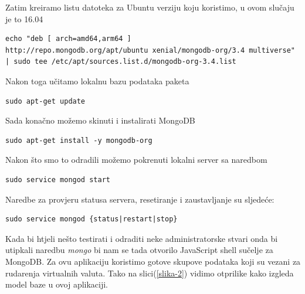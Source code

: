 \documentclass[a4paper,12pt]{foi}
\begin{document}
Zatim kreiramo listu datoteka za Ubuntu verziju koju koristimo, u ovom slučaju je to 16.04


\lstset{commentstyle=\textit,language=python}
\begin{lstlisting}[frame=tb]
echo "deb [ arch=amd64,arm64 ] 
http://repo.mongodb.org/apt/ubuntu xenial/mongodb-org/3.4 multiverse" 
| sudo tee /etc/apt/sources.list.d/mongodb-org-3.4.list
\end{lstlisting}


Nakon toga učitamo lokalnu bazu podataka paketa


\lstset{commentstyle=\textit,language=python}
\begin{lstlisting}[frame=tb]
sudo apt-get update
\end{lstlisting}


Sada konačno možemo skinuti i instalirati MongoDB


\lstset{commentstyle=\textit,language=python}
\begin{lstlisting}[frame=tb]
sudo apt-get install -y mongodb-org
\end{lstlisting}


Nakon što smo to odradili možemo pokrenuti lokalni server sa naredbom


\lstset{commentstyle=\textit,language=python}
\begin{lstlisting}[frame=tb]
sudo service mongod start
\end{lstlisting}


Naredbe za provjeru statusa servera, resetiranje i zaustavljanje su sljedeće:


\lstset{commentstyle=\textit,language=python}
\begin{lstlisting}[frame=tb]
sudo service mongod {status|restart|stop}
\end{lstlisting}


Kada bi htjeli nešto testirati i odraditi neke administratorske stvari onda bi utipkali naredbu \textit{mongo} bi nam se tada otvorilo JavaScript shell sučelje za MongoDB.
Za ovu aplikaciju koristimo gotove skupove podataka koji su vezani za rudarenja virtualnih valuta. Tako na slici(\ref{slika-2}) vidimo otprilike kako izgleda model baze u ovoj aplikaciji. 
\end{document}
